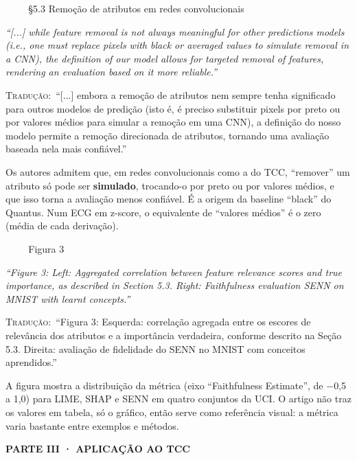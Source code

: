 \documentclass[11pt,a4paper]{article}
\newcommand{\pagechip}[1]{{\setlength{\fboxsep}{1.5pt}\colorbox{cAcc}{\textcolor{white}{\scriptsize\texttt{#1}}}}}
\newcommand{\partbar}[1]{\par\vspace{1.2em}\noindent\colorbox{black!80}{\parbox{\dimexpr\linewidth-2\fboxsep}{\color{white}\bfseries\sffamily\MakeUppercase{#1}}}\par\vspace{0.4em}}
\newenvironment{origquote}{\par\itshape\small}{\par}
\newenvironment{tradquote}{\par\small\textsc{Tradução:}\ }{\par}
\newcommand{\explab}[1]{\par\smallskip{\small\color{cAcc}\textbf{\MakeUppercase{#1}}}\par}
\begin{document}
\begin{citacard}{\pagechip{p. 6} §5.3 Remoção de atributos em redes convolucionais}
\begin{origquote}“[...] while feature removal is not always meaningful for other predictions models (i.e., one must replace pixels with black or averaged values to simulate removal in a CNN), the definition of our model allows for targeted removal of features, rendering an evaluation based on it more reliable.”\end{origquote}
\begin{tradquote}“[...] embora a remoção de atributos nem sempre tenha significado para outros modelos de predição (isto é, é preciso substituir pixels por preto ou por valores médios para simular a remoção em uma CNN), a definição do nosso modelo permite a remoção direcionada de atributos, tornando uma avaliação baseada nela mais confiável.”\end{tradquote}
\explab{Explicação}
Os autores admitem que, em redes convolucionais como a do TCC, “remover” um atributo só pode ser \textbf{simulado}, trocando-o por preto ou por valores médios, e que isso torna a avaliação menos confiável. É a origem da baseline “black” do Quantus. Num ECG em z-score, o equivalente de “valores médios” é o zero (média de cada derivação).
\end{citacard}

\begin{citacard}{\pagechip{p. 6} Figura 3}
\begin{origquote}“Figure 3: Left: Aggregated correlation between feature relevance scores and true importance, as described in Section 5.3. Right: Faithfulness evaluation SENN on MNIST with learnt concepts.”\end{origquote}
\begin{tradquote}“Figura 3: Esquerda: correlação agregada entre os escores de relevância dos atributos e a importância verdadeira, conforme descrito na Seção 5.3. Direita: avaliação de fidelidade do SENN no MNIST com conceitos aprendidos.”\end{tradquote}
\explab{Explicação}
A figura mostra a distribuição da métrica (eixo “Faithfulness Estimate”, de $-$0,5 a 1,0) para LIME, SHAP e SENN em quatro conjuntos da UCI. O artigo não traz os valores em tabela, só o gráfico, então serve como referência visual: a métrica varia bastante entre exemplos e métodos.
\end{citacard}

\partbar{Parte III · Aplicação ao TCC}
\end{document}
